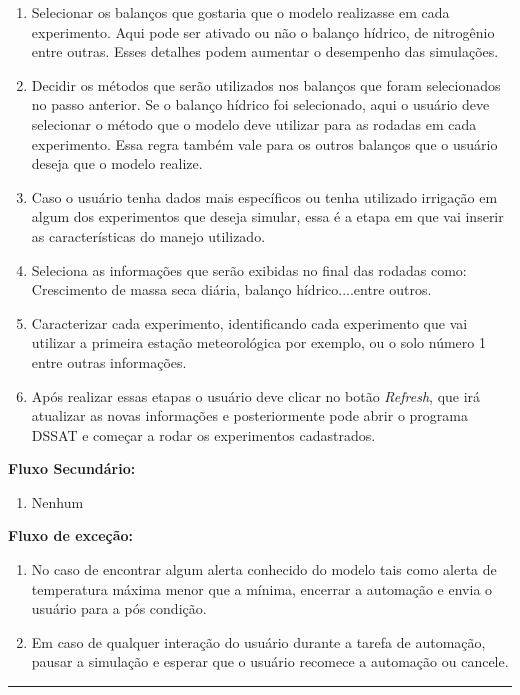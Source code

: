 \documentclass[tg]{mdtufsm}
\begin{document}
\begin{enumerate}
                		\item Selecionar os balanços que gostaria que o modelo realizasse em cada experimento. Aqui pode ser ativado ou não o balanço hídrico, de nitrogênio entre outras. Esses detalhes podem aumentar o desempenho das simulações.
                		\item Decidir os métodos que serão utilizados nos balanços que foram selecionados no passo anterior. Se o balanço hídrico foi selecionado, aqui o usuário deve selecionar o método que o modelo deve utilizar para as rodadas em cada experimento. Essa regra também vale para os outros balanços que o usuário deseja que o modelo realize.
                		\item Caso o usuário tenha dados mais específicos ou tenha utilizado irrigação em algum dos experimentos que deseja simular, essa é a etapa em que vai inserir as características do manejo utilizado.
                		\item Seleciona as informações que serão exibidas no final das rodadas como: Crescimento de massa seca diária, balanço hídrico....entre outros.
                		\item Caracterizar cada experimento, identificando cada experimento que vai utilizar a primeira estação meteorológica por exemplo, ou o solo número 1 entre outras informações.
                		\item Após realizar essas etapas o usuário deve clicar no botão \emph{Refresh}, que irá atualizar as novas informações e posteriormente pode abrir o programa DSSAT e começar a rodar os experimentos cadastrados.
                	\end{enumerate}

                {\bf Fluxo Secundário:}
                	\begin{enumerate}
                		\item Nenhum
                	\end{enumerate}

                {\bf Fluxo de exceção:}
                	\begin{enumerate}
                		\item No caso de encontrar algum alerta conhecido do modelo tais como alerta de temperatura máxima menor que a mínima, encerrar a automação e envia o usuário para a pós condição.
                		\item Em caso de qualquer interação do usuário durante a tarefa de automação, pausar a simulação e esperar que o usuário recomece a automação ou cancele.
                	\end{enumerate}
            	\bigskip \hrule \bigskip
\end{document}
